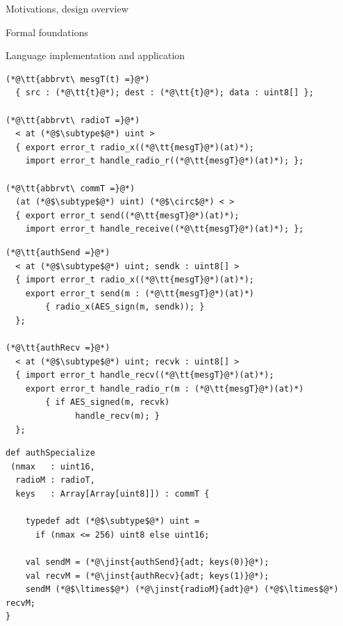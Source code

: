 
\begin{cenumerate}
\item Motivations, design overview
\item {}
\begin{citemize}
\item {} 
\item Formal foundations
\end{citemize}
\item Language implementation and application
\end{cenumerate}
\stopslide


\begin{lstlisting}
(*@\tt{abbrvt\ mesgT(t) =}@*)
  { src : (*@\tt{t}@*); dest : (*@\tt{t}@*); data : uint8[] };

(*@\tt{abbrvt\ radioT =}@*)
  < at (*@$\subtype$@*) uint >
  { export error_t radio_x((*@\tt{mesgT}@*)(at)*); 
    import error_t handle_radio_r((*@\tt{mesgT}@*)(at)*); };

(*@\tt{abbrvt\ commT =}@*)
  (at (*@$\subtype$@*) uint) (*@$\circ$@*) < >
  { export error_t send((*@\tt{mesgT}@*)(at)*); 
    import error_t handle_receive((*@\tt{mesgT}@*)(at)*); };
\end{lstlisting}
\stopslide


\begin{lstlisting}
(*@\tt{authSend =}@*)
  < at (*@$\subtype$@*) uint; sendk : uint8[] >  
  { import error_t radio_x((*@\tt{mesgT}@*)(at)*);
    export error_t send(m : (*@\tt{mesgT}@*)(at)*) 
        { radio_x(AES_sign(m, sendk)); }
  };

(*@\tt{authRecv =}@*)
  < at (*@$\subtype$@*) uint; recvk : uint8[] >  
  { import error_t handle_recv((*@\tt{mesgT}@*)(at)*);
    export error_t handle_radio_r(m : (*@\tt{mesgT}@*)(at)*) 
        { if AES_signed(m, recvk) 
              handle_recv(m); }
  };
\end{lstlisting}
\stopslide


\begin{lstlisting}
def authSpecialize
 (nmax   : uint16,
  radioM : radioT,
  keys   : Array[Array[uint8]]) : commT {

    typedef adt (*@$\subtype$@*) uint =
      if (nmax <= 256) uint8 else uint16;

    val sendM = (*@\jinst{authSend}{adt; keys(0)}@*);
    val recvM = (*@\jinst{authRecv}{adt; keys(1)}@*);
    sendM (*@$\ltimes$@*) (*@\jinst{radioM}{adt}@*) (*@$\ltimes$@*) recvM;
}
\end{lstlisting}
\stopslide

